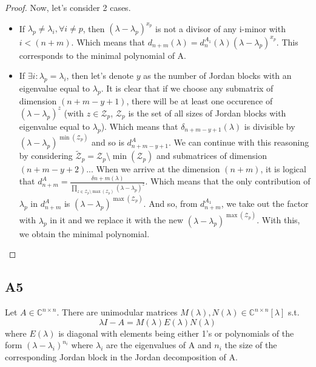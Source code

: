 \documentclass[11pt]{article}
\begin{document}
\begin{proof}
 Now, let's consider 2 cases.
 \begin{itemize}
 \item If $\lambda_p \neq \lambda_i , \forall i\neq p$, then $(\lambda - \lambda_p)^{x_p}$ is not a divisor of any i-minor with $i < (n+m)$. Which means that $d_{n+m}(\lambda) = d_{n}^{A_1}(\lambda) (\lambda - \lambda_p)^{x_p}$. This corresponds to the minimal polynomial of A.
 \item If $\exists i : \lambda_p = \lambda_i$, then let's denote $y$ as the number of Jordan blocks with an eigenvalue equal to $\lambda_p$. It is clear that if we choose any submatrix of dimension $(n+m-y+1)$, there will be at least one occurence of $(\lambda - \lambda_p)^{z}$ (with $ z \in \mathcal{Z}_p$, $\mathcal{Z}_p$ is the set of all sizes of Jordan blocks with eigenvalue equal to $\lambda_p$). Which means that $\delta_{n+m-y+1} (\lambda)$ is divisible by $(\lambda - \lambda_p)^{\min(\mathcal{Z}_p)}$ and so is $d_{n+m-y+1}^{A}$. We can continue with this reasoning by considering  $\tilde{\mathcal{Z}}_p =  \mathcal{Z}_p \setminus \min(\mathcal{Z}_p)$ and submatrices of dimension $(n+m-y+2)$... When we arrive at the dimension $(n+m)$, it is logical that $d_{n+m}^{A} = \frac{\delta{n+m}(\lambda)}{\prod_{z \in \mathcal{Z}_p\setminus \max{(\mathcal{Z}_p)}}(\lambda - \lambda_p)^{z}}$. Which means that the only contribution of $\lambda_p$ in $d_{n+m}^{A}$ is $(\lambda - \lambda_p)^{\max(\mathcal{Z}_p)}$. And so, from $d_{n+m}^{A_1}$, we take out the factor with $\lambda_p$ in it and we replace it with the new $(\lambda - \lambda_p)^{\max(\mathcal{Z}_p)}$. With this, we obtain the minimal polynomial.
 \end{itemize}
\end{proof}
\subsection*{A5}
Let $A\in \mathbb{C}^{n\times n}$. There are unimodular matrices $M(\lambda), N(\lambda) \in \mathbb{C}^{n\times n}[\lambda]$ s.t. 
\[\lambda I - A = M(\lambda)E(\lambda)N(\lambda)
\] where $E(\lambda)$ is diagonal with elements being either 1's or polynomials of the form $(\lambda - \lambda_i)^{n_i}$ where $ \lambda_i$ are the eigenvalues of A and $n_i$ the size of the corresponding Jordan block in the Jordan decomposition of A.
\end{document}
